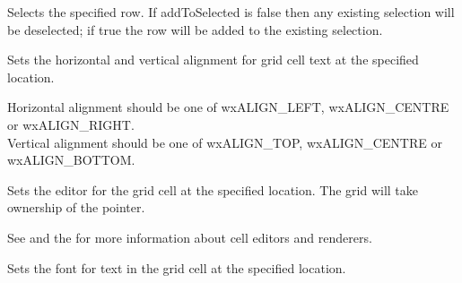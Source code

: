\label{wxgridselectrow}


Selects the specified row. If addToSelected is false then any existing selection will be
deselected; if true the row will be added to the existing selection.



\label{wxgridsetcellalignment}



Sets the horizontal and vertical alignment for grid cell text at the specified location.

Horizontal alignment should be one of wxALIGN\_LEFT, wxALIGN\_CENTRE or wxALIGN\_RIGHT. \\
Vertical alignment should be one of wxALIGN\_TOP, wxALIGN\_CENTRE or wxALIGN\_BOTTOM.



\label{wxgridsetcellbackgroundcolour}




\label{wxgridsetcelleditor}


Sets the editor for the grid cell at the specified location.
The grid will take ownership of the pointer.

See  and
the  for more information about cell editors and renderers.



\label{wxgridsetcellfont}


Sets the font for text in the grid cell at the specified location.



